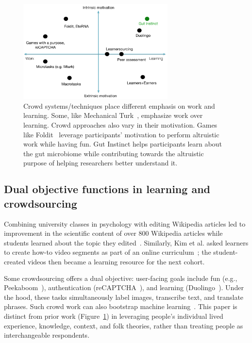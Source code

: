 \begin{figure}[h]
  \centering
  \includegraphics[width=0.7\textwidth]{figures/gutinstinct/gi-2.png}
  \caption[Crowd systems/techniques place different emphasis on
work and learning]
{Crowd systems/techniques place different emphasis on
work and learning. Some, like Mechanical Turk~\cite{Amazon2016}, emphasize
work over learning. Crowd approaches also vary in their motivation.
Games like Foldit~\cite{Cooper2010} leverage participants’ motivation
to perform altruistic work while having fun. Gut Instinct helps
participants learn about the gut microbiome while contributing
towards the altruistic purpose of helping researchers better
understand it.    }
  \label{fig:gi-2}
\end{figure}

\subsection{Dual objective functions in learning and crowdsourcing}
Combining university classes in psychology with editing
Wikipedia articles led to improvement in the scientific
content of over 800 Wikipedia articles while students
learned about the topic they edited~\cite{Farzan2013}. Similarly, Kim et
al. asked learners to create how-to video segments as part
of an online curriculum~\cite{Kim2015f}; the student-created videos
then became a learning resource for the next cohort. 

Some crowdsourcing offers a dual objective: user-facing
goals include fun (e.g., Peekaboom~\cite{VonAhn2006}), authentication
(reCAPTCHA~\cite{Ahn2008}), and learning (Duolingo~\cite{Hacker2014}). Under the
hood, these tasks simultaneously label images, transcribe
text, and translate phrases. Such crowd work can also bootstrap machine learning~\cite{Bernstein2012c}. This paper is distinct from prior
work (Figure~\ref{fig:gi-2}) in leveraging people’s individual lived
experience, knowledge, context, and folk theories, rather
than treating people as interchangeable respondents.


